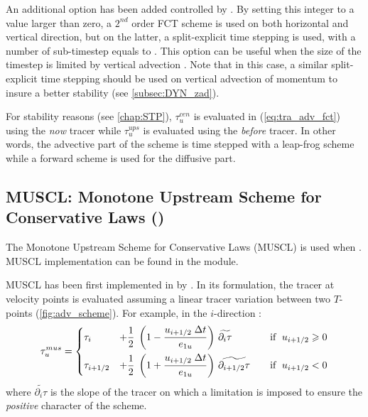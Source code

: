 \documentclass[../tex_main/NEMO_manual]{subfiles}
\begin{document}
An additional option has been added controlled by . By setting this integer to 
a value larger than zero, a $2^{nd}$ order FCT scheme is used on both horizontal and vertical direction, 
but on the latter, a split-explicit time stepping is used, with a number of sub-timestep equals
to . This option can be useful when the size of the timestep is limited 
by vertical advection \citep{Lemarie_OM2015}. Note that in this case, a similar split-explicit 
time stepping should be used on vertical advection of momentum to insure a better stability
(see \autoref{subsec:DYN_zad}).

For stability reasons (see \autoref{chap:STP}), $\tau _u^{cen}$ is evaluated in (\autoref{eq:tra_adv_fct}) 
using the \textit{now} tracer while $\tau _u^{ups}$ is evaluated using the \textit{before} tracer. In other words, 
the advective part of the scheme is time stepped with a leap-frog scheme 
while a forward scheme is used for the diffusive part. 

\subsection{MUSCL: Monotone Upstream Scheme for Conservative Laws (\protect{})}
\label{subsec:TRA_adv_mus}

The Monotone Upstream Scheme for Conservative Laws (MUSCL) is used when . 
MUSCL implementation can be found in the  module.

MUSCL has been first implemented in \NEMO by \citet{Levy_al_GRL01}. In its formulation, the tracer at velocity points 
is evaluated assuming a linear tracer variation between two $T$-points 
(\autoref{fig:adv_scheme}). For example, in the $i$-direction :
\begin{equation} \label{eq:tra_adv_mus}
   \tau _u^{mus} = \left\{      \begin{aligned}
         &\tau _i  &+ \frac{1}{2} \;\left( 1-\frac{u_{i+1/2} \;\Delta t}{e_{1u}} \right)
         &\ \widetilde{\partial _i \tau}  & \quad \text{if }\;u_{i+1/2} \geqslant 0      \\
         &\tau _{i+1/2} &+\frac{1}{2}\;\left( 1+\frac{u_{i+1/2} \;\Delta t}{e_{1u} } \right)
         &\ \widetilde{\partial_{i+1/2} \tau } & \text{if }\;u_{i+1/2} <0
   \end{aligned}    \right.
\end{equation}
where $\widetilde{\partial _i \tau}$ is the slope of the tracer on which a limitation 
is imposed to ensure the \textit{positive} character of the scheme.
\end{document}
